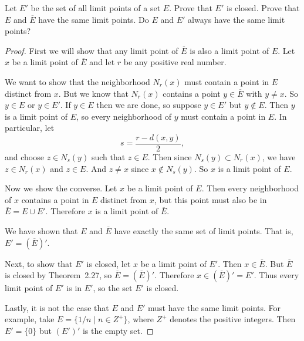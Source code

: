  Let $E'$ be the set of all limit points of a set $E$. Prove
that $E'$ is closed. Prove that $E$ and $\overline{E}$ have the same limit
points. Do $E$ and $E'$ always have the same limit points?
\begin{proof}
  First we will show that any limit point of $\overline{E}$ is also a
  limit point of $E$. Let $x$ be a limit point of $\overline{E}$ and
  let $r$ be any positive real number.

  We want to show that the neighborhood $N_r(x)$ must contain a point
  in $E$ distinct from $x$. But we know that $N_r(x)$ contains a point
  $y\in\overline{E}$ with $y\neq x$. So $y\in E$ or $y\in E'$. If
  $y\in E$ then we are done, so suppose $y\in E'$ but $y\not\in
  E$. Then $y$ is a limit point of $E$, so every neighborhood of $y$
  must contain a point in $E$. In particular, let
  \begin{equation*}
    s = \frac{r - d(x,y)}2,
  \end{equation*}
  and choose $z\in N_s(y)$ such that $z\in E$. Then since
  $N_s(y)\subset N_r(x)$, we have $z\in N_r(x)$ and $z\in E$. And
  $z\neq x$ since $x\not\in N_s(y)$. So $x$ is a limit point of $E$.

  Now we show the converse. Let $x$ be a limit point of $E$. Then
  every neighborhood of $x$ contains a point in $E$ distinct from $x$,
  but this point must also be in $\overline{E} = E\cup E'$. Therefore
  $x$ is a limit point of $\overline{E}$.

  We have shown that $E$ and $\overline{E}$ have exactly the same set
  of limit points. That is, $E' = (\overline{E})'$.

  Next, to show that $E'$ is closed, let $x$ be a limit point of
  $E'$. Then $x\in\overline{E}$. But $\overline{E}$ is closed by
  Theorem~2.27, so $\overline{E} = (\overline{E})'$. Therefore
  $x\in(\overline{E})' = E'$. Thus every limit point of $E'$ is in
  $E'$, so the set $E'$ is closed.

  Lastly, it is not the case that $E$ and $E'$ must have the same
  limit points. For example, take $E = \{ 1/n \mid n\in Z^+ \}$, where
  $Z^+$ denotes the positive integers. Then $E' = \{0\}$ but $(E')'$
  is the empty set.
\end{proof}

